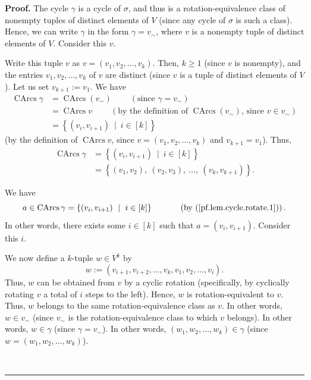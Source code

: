 \documentclass[numbers=enddot,12pt,final,onecolumn,notitlepage]{scrartcl}%
\numberwithin{exer}{section}
\theoremstyle{definition}
\newenvironment{proof}[1][Proof]{\noindent\textbf{#1.} }{\ \rule{0.5em}{0.5em}}
\newenvironment{verlong}{}{}
\begin{document}
\begin{verlong}
\begin{proof}
The cycle $\gamma$ is a cycle of $\sigma$, and thus is a rotation-equivalence
class of nonempty tuples of distinct elements of $V$ (since any cycle of
$\sigma$ is such a class). Hence, we can write $\gamma$ in the form
$\gamma=v_{\sim}$, where $v$ is a nonempty tuple of distinct elements of $V$.
Consider this $v$.

Write this tuple $v$ as $v=\left(  v_{1},v_{2},\ldots,v_{k}\right)  $. Then,
$k\geq1$ (since $v$ is nonempty), and the entries $v_{1},v_{2},\ldots,v_{k}$
of $v$ are distinct (since $v$ is a tuple of distinct elements of $V$). Let us
set $v_{k+1}:=v_{1}$. We have%
\begin{align}
\operatorname*{CArcs}\gamma &  =\operatorname*{CArcs}\left(  v_{\sim}\right)
\ \ \ \ \ \ \ \ \ \ \left(  \text{since }\gamma=v_{\sim}\right) \nonumber\\
&  =\operatorname*{CArcs}v\ \ \ \ \ \ \ \ \ \ \left(  \text{by the definition
of }\operatorname*{CArcs}\left(  v_{\sim}\right)  \text{, since }v\in v_{\sim
}\right) \nonumber\\
&  =\left\{  \left(  v_{i},v_{i+1}\right)  \ \mid\ i\in\left[  k\right]
\right\}  \label{pf.lem.cycle.rotate.1}%
\end{align}
(by the definition of $\operatorname*{CArcs}v$, since $v=\left(  v_{1}%
,v_{2},\ldots,v_{k}\right)  $ and $v_{k+1}=v_{1}$). Thus,%
\begin{align}
\operatorname*{CArcs}\gamma &  =\left\{  \left(  v_{i},v_{i+1}\right)
\ \mid\ i\in\left[  k\right]  \right\} \nonumber\\
&  =\left\{  \left(  v_{1},v_{2}\right)  ,\ \left(  v_{2},v_{3}\right)
,\ \ldots,\ \left(  v_{k},v_{k+1}\right)  \right\}  .
\label{pf.lem.cycle.rotate.2}%
\end{align}


We have
\[
a\in\operatorname*{CArcs}\gamma=\left\{  \left(  v_{i},v_{i+1}\right)
\ \mid\ i\in\left[  k\right]  \right\}  \ \ \ \ \ \ \ \ \ \ \left(  \text{by
(\ref{pf.lem.cycle.rotate.1})}\right)  .
\]
In other words, there exists some $i\in\left[  k\right]  $ such that
$a=\left(  v_{i},v_{i+1}\right)  $. Consider this $i$.

We now define a $k$-tuple $w\in V^{k}$ by%
\[
w:=\left(  v_{i+1},v_{i+2},\ldots,v_{k},v_{1},v_{2},\ldots,v_{i}\right)  .
\]
Thus, $w$ can be obtained from $v$ by a cyclic rotation (specifically, by
cyclically rotating $v$ a total of $i$ steps to the left). Hence, $w$ is
rotation-equivalent to $v$. Thus, $w$ belongs to the same rotation-equivalence
class as $v$. In other words, $w\in v_{\sim}$ (since $v_{\sim}$ is the
rotation-equivalence class to which $v$ belongs). In other words, $w\in\gamma$
(since $\gamma=v_{\sim}$). In other words, $\left(  w_{1},w_{2},\ldots
,w_{k}\right)  \in\gamma$ (since $w=\left(  w_{1},w_{2},\ldots,w_{k}\right)  $).


\end{proof}
\end{verlong}
\end{document}
